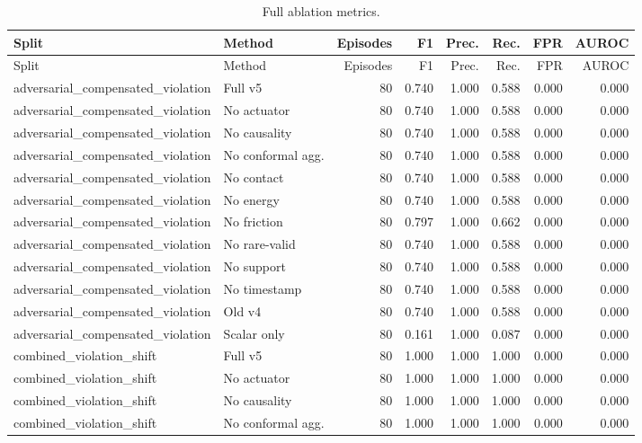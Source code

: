 {\scriptsize
\setlength{\tabcolsep}{2.5pt}
\begin{longtable}{llrrrrrr}
\caption{Full ablation metrics.}\label{tab:full-ablation}\\
\toprule
Split & Method & Episodes & F1 & Prec. & Rec. & FPR & AUROC \\
\midrule
\endfirsthead
\toprule
Split & Method & Episodes & F1 & Prec. & Rec. & FPR & AUROC \\
\midrule
\endhead
adversarial\_compensated\_violation & Full v5 & 80 & 0.740 & 1.000 & 0.588 & 0.000 & 0.000 \\
adversarial\_compensated\_violation & No actuator & 80 & 0.740 & 1.000 & 0.588 & 0.000 & 0.000 \\
adversarial\_compensated\_violation & No causality & 80 & 0.740 & 1.000 & 0.588 & 0.000 & 0.000 \\
adversarial\_compensated\_violation & No conformal agg. & 80 & 0.740 & 1.000 & 0.588 & 0.000 & 0.000 \\
adversarial\_compensated\_violation & No contact & 80 & 0.740 & 1.000 & 0.588 & 0.000 & 0.000 \\
adversarial\_compensated\_violation & No energy & 80 & 0.740 & 1.000 & 0.588 & 0.000 & 0.000 \\
adversarial\_compensated\_violation & No friction & 80 & 0.797 & 1.000 & 0.662 & 0.000 & 0.000 \\
adversarial\_compensated\_violation & No rare-valid & 80 & 0.740 & 1.000 & 0.588 & 0.000 & 0.000 \\
adversarial\_compensated\_violation & No support & 80 & 0.740 & 1.000 & 0.588 & 0.000 & 0.000 \\
adversarial\_compensated\_violation & No timestamp & 80 & 0.740 & 1.000 & 0.588 & 0.000 & 0.000 \\
adversarial\_compensated\_violation & Old v4 & 80 & 0.740 & 1.000 & 0.588 & 0.000 & 0.000 \\
adversarial\_compensated\_violation & Scalar only & 80 & 0.161 & 1.000 & 0.087 & 0.000 & 0.000 \\
combined\_violation\_shift & Full v5 & 80 & 1.000 & 1.000 & 1.000 & 0.000 & 0.000 \\
combined\_violation\_shift & No actuator & 80 & 1.000 & 1.000 & 1.000 & 0.000 & 0.000 \\
combined\_violation\_shift & No causality & 80 & 1.000 & 1.000 & 1.000 & 0.000 & 0.000 \\
combined\_violation\_shift & No conformal agg. & 80 & 1.000 & 1.000 & 1.000 & 0.000 & 0.000 \\

\end{longtable}}
